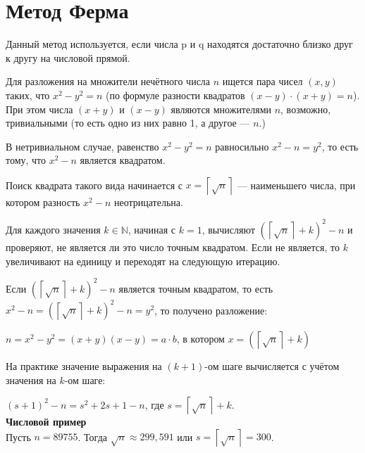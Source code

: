 \documentclass[12pt,a4paper]{scrartcl}
\begin{document}
\section{Метод Ферма}

Данный метод используется, если числа p и q находятся достаточно близко друг к другу на числовой прямой.

Для разложения на множители нечётного числа $n$ ищется пара чисел $(x, y)$ таких, что $x^{2}-y^{2}=n$ (по формуле разности квадратов $(x-y)\cdot (x+y)=n$). При этом числа $(x+y)$ и $(x-y)$ являются множителями $n$, возможно, тривиальными (то есть одно из них равно 1, а другое — $n$.)

В нетривиальном случае, равенство $x^{2}-y^{2}=n$ равносильно $x^{2}-n=y^{2}$, то есть тому, что $x^{2}-n$ является квадратом.

Поиск квадрата такого вида начинается с $x=\left\lceil {\sqrt {n}}\right\rceil$  — наименьшего числа, при котором разность $x^{2}-n$ неотрицательна.

Для каждого значения $k\in \mathbb {N}$, начиная с $k=1$, вычисляют $(\left\lceil {\sqrt {n}}\right\rceil +k)^{2}-n$ и проверяют, не является ли это число точным квадратом. Если не является, то $k$ увеличивают на единицу и переходят на следующую итерацию.

Если $(\left\lceil {\sqrt {n}}\right\rceil +k)^{2}-n$ является точным квадратом, то есть $x^{2}-n=(\left\lceil {\sqrt {n}}\right\rceil +k)^{2}-n=y^{2}$, то получено разложение:

$n=x^{2}-y^{2}=(x+y)(x-y)=a\cdot b$, в котором $x=(\left\lceil {\sqrt {n}}\right\rceil +k)$

На практике значение выражения на $(k+1)$-ом шаге вычисляется с учётом значения на $k$-ом шаге:

$\left(s+1\right)^{2}-n=s^{2}+2s+1-n$, где $s=\left\lceil {\sqrt {n}}\right\rceil +k$.\\

\textbf{Числовой пример}\\

Пусть $n=89755$. Тогда ${\sqrt {n}}\approx 299,591$ или $s=\left\lceil {\sqrt {n}}\right\rceil =300$.
\end{document}
